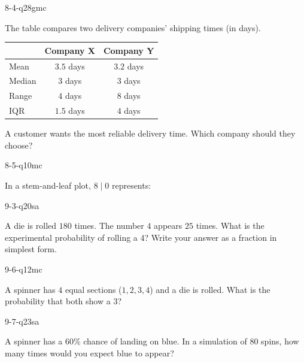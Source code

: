 \begin{practiceQuestion}{8-4-q28}{gmc}
\begin{questionText}
The table compares two delivery companies' shipping times (in days).

\begin{center}
\begin{tabular}{|l|c|c|}
\hline
 & \textbf{Company X} & \textbf{Company Y} \\
\hline
Mean & $3.5$ days & $3.2$ days \\
\hline
Median & $3$ days & $3$ days \\
\hline
Range & $4$ days & $8$ days \\
\hline
IQR & $1.5$ days & $4$ days \\
\hline
\end{tabular}
\end{center}

A customer wants the most reliable delivery time. Which company should they choose?
\end{questionText}
\end{practiceQuestion}

\begin{practiceQuestion}{8-5-q10}{mc}
\begin{questionText}
In a stem-and-leaf plot, $8 \mid 0$ represents:
\end{questionText}
\end{practiceQuestion}

\begin{practiceQuestion}{9-3-q20}{sa}
\begin{questionText}
A die is rolled $180$ times. The number $4$ appears $25$ times. What is the experimental probability of rolling a $4$? Write your answer as a fraction in simplest form.
\end{questionText}
\end{practiceQuestion}

\begin{practiceQuestion}{9-6-q12}{mc}
\begin{questionText}
A spinner has $4$ equal sections ($1, 2, 3, 4$) and a die is rolled. What is the probability that both show a $3$?
\end{questionText}
\end{practiceQuestion}

\begin{practiceQuestion}{9-7-q23}{sa}
\begin{questionText}
A spinner has a $60\%$ chance of landing on blue. In a simulation of $80$ spins, how many times would you expect blue to appear?
\end{questionText}
\end{practiceQuestion}
